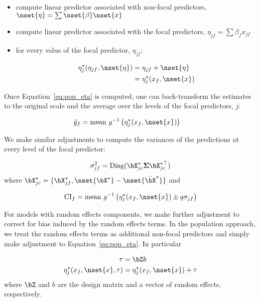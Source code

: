 \begin{itemize}
\item compute linear predictor associated with non-focal predictors, $\nset{\eta} = \sum \nset{\beta} \nset{x}$
\item compute linear predictor associated with the focal predictors, $\eta_{jf} = \sum{\beta_f x_{jf}}$
\item for every value of the focal predictor, $\eta_{jf}$:

\begin{align}\label{eq:pop_eta} 
\eta_j^\star(\eta_{jf}, \nset{\eta})  &= \eta_{jf} + \nset{\eta} \nonumber \\
&= \eta_j^\star(x_f, \nset{x})
\end{align}
\end{itemize}

Once Equation~\ref{eq:pop_eta} is computed, one can back-transform the estimates to the original scale and the average over the levels of the focal predictors, $j$:

\begin{align}\label{eq:pop_response} 
\hat{y}_f  &= \textrm{mean} ~ g^{-1} \left(\eta_j^\star(x_f, \nset{x})\right)
\end{align}

We make similar adjustments to compute the variances of the predictions at every level of the focal predictor:

\begin{align}
\sigma_{jf}^2 = \textrm{Diag}(\bX^\star_{jc} \boldsymbol{\Sigma} \bX^{\star\top}_{jc})
\end{align}
where $\bX^{\star}_{jc} = \{\bX_{jf}^\star, \nset{{\bX}^\star} - \nset{{\bar{\bX}}^\star}\}$ and 

\begin{align}
\mathrm{CI}_f = \mathrm{mean} ~ g^{-1} \left(\eta_j^\star(x_f, \nset{x}) \pm q\sigma_{jf}\right)
\end{align}


For models with random effects components, we make further adjustment to correct for bias induced by the random effects terms. In the population approach, we treat the random effects terms as additional non-focal predictors and simply make adjustment to Equation~\ref{eq:pop_eta}. In particular

\begin{align}\label{eq:pop_eta_re} 
\tau &= \bZ b \nonumber \\
\eta_j^\star(x_f, \nset{x}, \tau)  &= \eta_j^\star(x_f, \nset{x}) + \tau
\end{align}
where $\bZ$ and $b$ are the design matrix and a vector of random effects, respectively.

